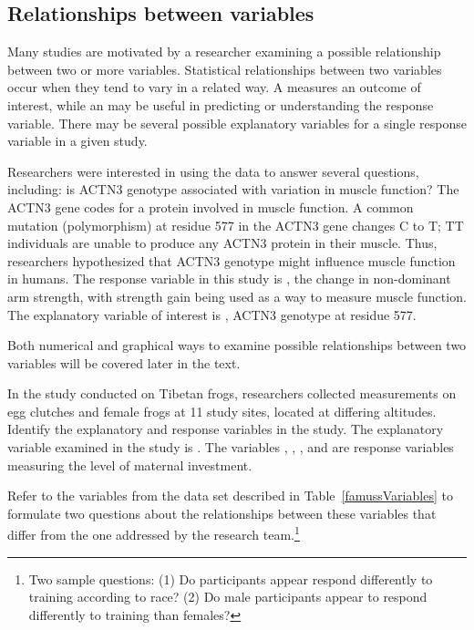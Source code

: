 \begin{doublespace}
\subsection{Relationships between variables}
\label{variableRelations}

Many studies are motivated by a researcher examining a possible relationship between two or more variables. Statistical relationships between two variables occur when they tend to vary in a related way. A  measures an outcome of interest, while an  may be useful in predicting or understanding the response variable. There may be several possible explanatory variables for a single response variable in a given study.

Researchers were interested in using the  data to answer several questions, including: is ACTN3 genotype associated with variation in muscle function? The ACTN3 gene codes for a protein involved in muscle function. A common mutation (polymorphism) at residue 577 in the ACTN3 gene changes C to T; TT individuals are unable to produce any ACTN3 protein in their muscle. Thus, researchers hypothesized that ACTN3 genotype might influence muscle function in humans. The response variable in this study is , the change in non-dominant arm strength, with strength gain being used as a way to measure muscle function. The explanatory variable of interest is , ACTN3 genotype at residue 577.  

Both numerical and graphical ways to examine possible relationships between two variables will be covered later in the text.

\begin{example}{In the study conducted on Tibetan frogs, researchers collected measurements on egg clutches and female frogs at 11 study sites, located at differing altitudes. Identify the explanatory and response variables in the study.}
The explanatory variable examined in the study is . The variables , , , and  are response variables measuring the level of maternal investment. 
\end{example}	

\begin{exercise}
Refer to the variables from the  data set described in Table~\ref{famussVariables} to formulate two questions about the relationships between these variables that differ from the one addressed by the research team.\footnote{Two sample questions: (1)  Do participants appear respond differently to training according to race?  (2)  Do male participants appear to respond differently to training than females?}


\end{exercise}
\end{doublespace}
